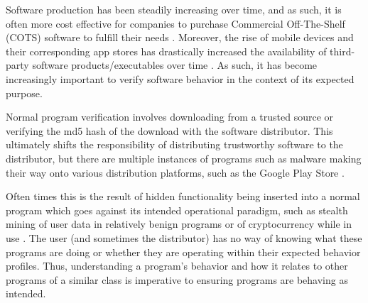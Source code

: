 Software production has been steadily increasing over time, and as such, it is often more cost effective for companies to purchase Commercial Off-The-Shelf (COTS) software to fulfill their needs \cite{agrawal2016trends}. Moreover, the rise of mobile devices and their corresponding app stores has drastically increased the availability of third-party software products/executables over time \cite{statista}. As such, it has become increasingly important to verify software behavior in the context of its expected purpose. 

Normal program verification involves downloading from a trusted source or verifying the md5 hash of the download with the software distributor. This ultimately shifts the responsibility of distributing trustworthy software to the distributor, but there are multiple instances of programs such as malware making their way onto various distribution platforms, such as the Google Play Store \cite{maier2014divide}. 

Often times this is the result of hidden functionality being inserted into a normal program which goes against its intended operational paradigm, such as stealth mining of user data in relatively benign programs \cite{bosu2017collusive} or of cryptocurrency while in use \cite{palmer_2019}. The user (and sometimes the distributor) has no way of knowing what these programs are doing or whether they are operating within their expected behavior profiles. Thus, understanding a program's behavior and how it relates to other programs of a similar class is imperative to ensuring programs are behaving as intended.